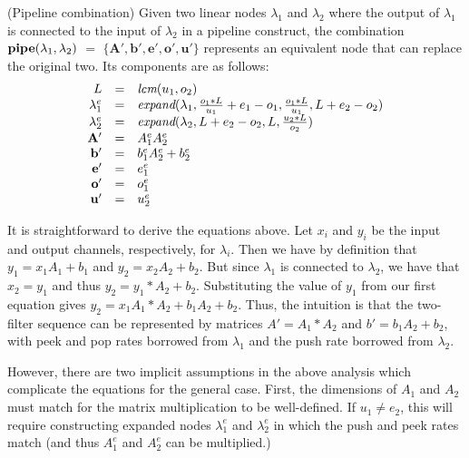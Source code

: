 \begin{transformation} (Pipeline combination)
Given two linear nodes $\lambda_1$ and $\lambda_2$ where the output of
$\lambda_1$ is connected to the input of $\lambda_2$ in a pipeline
construct, the combination $\mbox{\bf pipe}(\lambda_1, \lambda_2)$ $=$
$\mathbf{ \{A', b', e', o', u'\}}$ represents an equivalent node that
can replace the original two.  Its components are as follows: \\
\begin{equation} \nonumber
\begin{array}{rcl}
L & = & \mbox{\it lcm}(u_1, o_2) \\
\lambda_1^e & = & \mbox{\it expand}(\lambda_1, \frac{o_1 * L}{u_1} + e_1 - o_1, 
\frac{o_1 * L}{u_1}, L+e_2-o_2) \\
\lambda_2^e & = & \mbox{\it expand}(\lambda_2, L+e_2-o_2, L, \frac{u_2 * L}{o_2}) \\
\mathbf{A'} & = & A_1^e A_2^e \\
\mathbf{b'} & = & b_1^e A_2^e + b_2^e \\
\mathbf{e'} & = & e_1^e \\
\mathbf{o'} & = & o_1^e \\
\mathbf{u'} & = & u_2^e
\end{array}
\end{equation}
\end{transformation}

It is straightforward to derive the equations above.  Let $x_i$ and
$y_i$ be the input and output channels, respectively, for $\lambda_i$.
Then we have by definition that $y_1 = x_1 A_1 + b_1$ and $y_2 = x_2
A_2 + b_2$.  But since $\lambda_1$ is connected to $\lambda_2$, we
have that $x_2 = y_1$ and thus $y_2 = y_1 * A_2 + b_2$.  Substituting
the value of $y_1$ from our first equation gives $y_2 = x_1 A_1 * A_2
+ b_1 A_2 + b_2$.  Thus, the intuition is that the two-filter sequence
can be represented by matrices $A' = A_1 * A_2$ and $b' = b_1 A_2 +
b_2$, with peek and pop rates borrowed from $\lambda_1$ and the push
rate borrowed from $\lambda_2$.

However, there are two implicit assumptions in the above analysis
which complicate the equations for the general case.  First, the
dimensions of $A_1$ and $A_2$ must match for the matrix multiplication
to be well-defined.  If $u_1 \ne e_2$, this will require constructing
expanded nodes $\lambda_1^e$ and $\lambda_2^e$ in which the push and
peek rates match (and thus $A_1^e$ and $A_2^e$ can be multiplied.)

